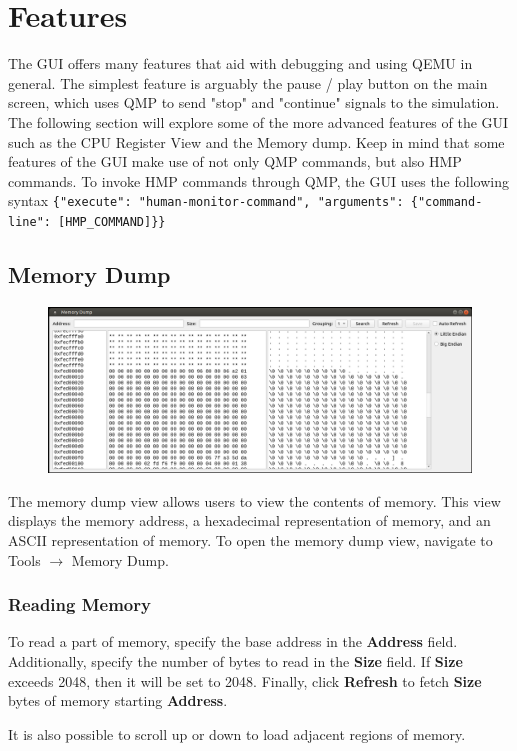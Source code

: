 \documentclass{article}
\newcommand{\code}[1]{\texttt{#1}}
\begin{document}
\section{Features}
The GUI offers many features that aid with debugging and using QEMU in general. The simplest feature is arguably the pause / play button on the main screen, which uses QMP to send "stop" and "continue" signals to the simulation. The following section will explore some of the more advanced features of the GUI such as the CPU Register View and the Memory dump. Keep in mind that some features of the GUI make use of not only QMP commands, but also HMP commands. To invoke HMP commands through QMP, the GUI uses the following syntax \code{\{"execute": "human-monitor-command", "arguments": \{"command-line": [HMP\_COMMAND]\}\}}
\subsection{Memory Dump}
\begin{figure}[h]
    \centering
    \includegraphics[width=\linewidth]{images/MemDump.PNG}
    \label{fig:memdump}
\end{figure}

The memory dump view allows users to view the contents of memory. This view displays the memory address, a hexadecimal representation of memory, and an ASCII representation of memory. To open the memory dump view, navigate to Tools $\rightarrow$ Memory Dump.

\subsubsection{Reading Memory}
To read a part of memory, specify the base address in the \textbf{Address} field. Additionally, specify the number of bytes to read in the \textbf{Size} field. If \textbf{Size} exceeds 2048, then it will be set to 2048. Finally, click \textbf{Refresh} to fetch \textbf{Size} bytes of memory starting \textbf{Address}.\par 
It is also possible to scroll up or down to load adjacent regions of memory. 
\end{document}
